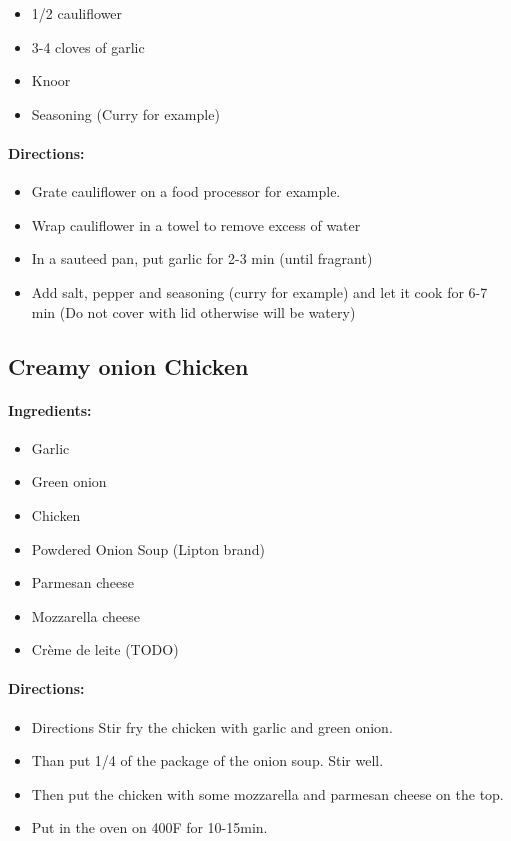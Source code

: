 \documentclass{article}
\begin{document}
\begin{itemize}
	\item 1/2 cauliflower
	\item 3-4 cloves of garlic
	\item Knoor
	\item Seasoning (Curry for example)
\end{itemize}

\paragraph{Directions:}
\begin{itemize}
	\item Grate cauliflower on a food processor for example.
	\item Wrap cauliflower in a towel to remove excess of water
	\item In a sauteed pan, put garlic for 2-3 min (until fragrant)
	\item Add salt, pepper and seasoning (curry for example) and let it cook for 6-7 min (Do not cover with lid otherwise will be watery)
\end{itemize}

\subsection{Creamy onion Chicken}

\paragraph{Ingredients:}

\begin{itemize}
	\item Garlic 
	\item Green onion 
	\item Chicken 
	\item Powdered Onion Soup (Lipton brand) 
	\item Parmesan cheese 
	\item Mozzarella cheese 
	\item Crème de leite (TODO)
\end{itemize}

\paragraph{Directions:}
\begin{itemize}
	\item Directions Stir fry the chicken with garlic and green onion. 
	\item Than put 1/4 of the package of the onion soup. Stir well.
	\item Then put the chicken with some mozzarella and parmesan cheese on the top. 
	\item Put in the oven on 400F for 10-15min.
\end{itemize}
\end{document}
